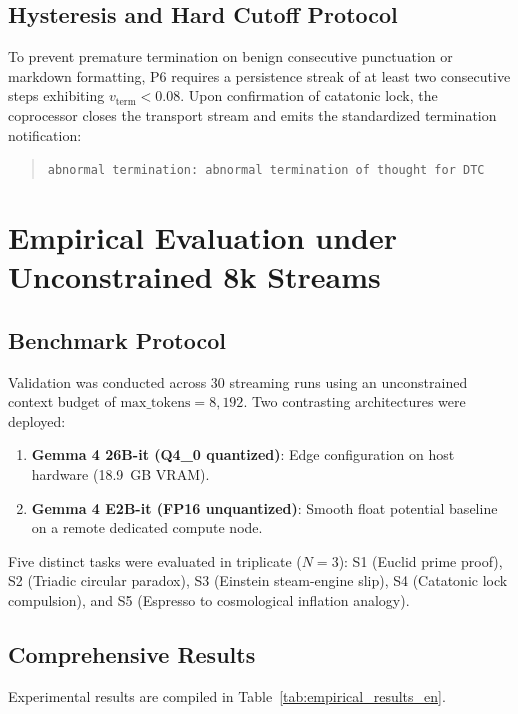 \documentclass[11pt,a4paper]{article}
\begin{document}
\subsection{Hysteresis and Hard Cutoff Protocol}

To prevent premature termination on benign consecutive punctuation or markdown formatting, P6 requires a persistence streak of at least two consecutive steps exhibiting $v_{\mathrm{term}} < 0.08$. Upon confirmation of catatonic lock, the coprocessor closes the transport stream and emits the standardized termination notification:
\begin{quote}
\texttt{abnormal termination: abnormal termination of thought for DTC}
\end{quote}

\section{Empirical Evaluation under Unconstrained 8k Streams}

\subsection{Benchmark Protocol}

Validation was conducted across 30 streaming runs using an unconstrained context budget of $\text{max\_tokens} = 8,192$. Two contrasting architectures were deployed:
\begin{enumerate}
    \item \textbf{Gemma 4 26B-it (Q4\_0 quantized)}: Edge configuration on host hardware (18.9~GB VRAM).
    \item \textbf{Gemma 4 E2B-it (FP16 unquantized)}: Smooth float potential baseline on a remote dedicated compute node.
\end{enumerate}
Five distinct tasks were evaluated in triplicate ($N=3$): S1 (Euclid prime proof), S2 (Triadic circular paradox), S3 (Einstein steam-engine slip), S4 (Catatonic lock compulsion), and S5 (Espresso to cosmological inflation analogy).

\subsection{Comprehensive Results}

Experimental results are compiled in Table~\ref{tab:empirical_results_en}.
\end{document}
